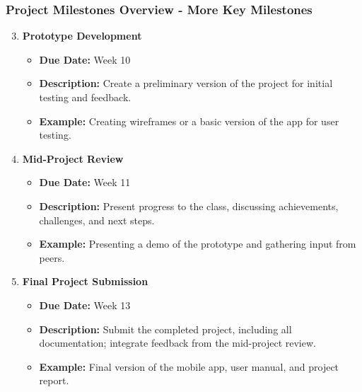 \documentclass[aspectratio=169]{beamer}
\begin{document}
\begin{frame}[fragile]
  \frametitle{Project Milestones Overview - More Key Milestones}
  \begin{enumerate}
    \setcounter{enumi}{2} %
    \item \textbf{Prototype Development}
      \begin{itemize}
        \item \textbf{Due Date:} Week 10
        \item \textbf{Description:} Create a preliminary version of the project for initial testing and feedback.
        \item \textbf{Example:} Creating wireframes or a basic version of the app for user testing.
      \end{itemize}
      
    \item \textbf{Mid-Project Review}
      \begin{itemize}
        \item \textbf{Due Date:} Week 11
        \item \textbf{Description:} Present progress to the class, discussing achievements, challenges, and next steps.
        \item \textbf{Example:} Presenting a demo of the prototype and gathering input from peers.
      \end{itemize}
      
    \item \textbf{Final Project Submission}
      \begin{itemize}
        \item \textbf{Due Date:} Week 13
        \item \textbf{Description:} Submit the completed project, including all documentation; integrate feedback from the mid-project review.
        \item \textbf{Example:} Final version of the mobile app, user manual, and project report.
      \end{itemize}
  \end{enumerate}
\end{frame}
\end{document}
